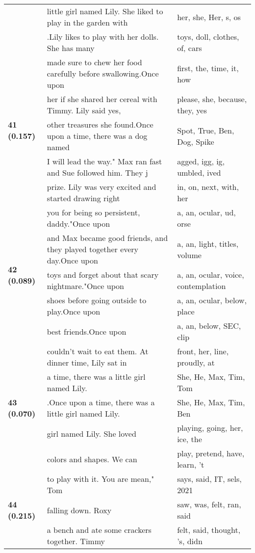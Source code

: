 \documentclass{article}
\begin{document}
\begin{adjustbox}{max width=\textwidth}
\begin{tabular}{p{} p{} p{}}
 & little girl named Lily. She liked to play in the garden with & her,  she, Her, s, os \\
 & .Lily likes to play with her dolls. She has many & toys,  doll,  clothes,  of,  cars \\
\midrule
\multirow{5}{*}{\textbf{41 (0.157)}} & made sure to chew her food carefully before swallowing.Once upon & first,  the,  time,  it,  how \\
 & her if she shared her cereal with Timmy. Lily said yes, & please,  she,  because,  they,  yes \\
 & other treasures she found.Once upon a time, there was a dog named & Spot,  True,  Ben,  Dog,  Spike \\
 & I will lead the way." Max ran fast and Sue followed him. They j & agged, igg, ig, umbled, ived \\
 & prize. Lily was very excited and started drawing right & in,  on,  next,  with,  her \\
\midrule
\multirow{5}{*}{\textbf{42 (0.089)}} & you for being so persistent, daddy."Once upon & a,  an, ocular, ud, orse \\
 & and Max became good friends, and they played together every day.Once upon & a,  an, light,  titles,  volume \\
 & toys and forget about that scary nightmare."Once upon & a,  an, ocular,  voice,  contemplation \\
 & shoes before going outside to play.Once upon & a,  an, ocular,  below, place \\
 & best friends.Once upon & a,  an,  below, SEC, clip \\
\midrule
\multirow{5}{*}{\textbf{43 (0.070)}} & couldn't wait to eat them.  At dinner time, Lily sat in & front,  her,  line,  proudly,  at \\
 & a time, there was a little girl named Lily. & She,  He,  Max,  Tim,  Tom \\
 & .Once upon a time, there was a little girl named Lily. & She,  He,  Max,  Tim,  Ben \\
 & girl named Lily. She loved & playing,  going,  her,  ice,  the \\
 & colors and shapes. We can & play,  pretend,  have,  learn, 't \\
\midrule
\multirow{5}{*}{\textbf{44 (0.215)}} & to play with it. You are mean," Tom & says,  said,  IT, sels,  2021 \\
 & falling down. Roxy & saw,  was,  felt,  ran,  said \\
 & a bench and ate some crackers together. Timmy & felt,  said,  thought, 's,  didn \\

\end{tabular}
\end{adjustbox}
\end{document}
